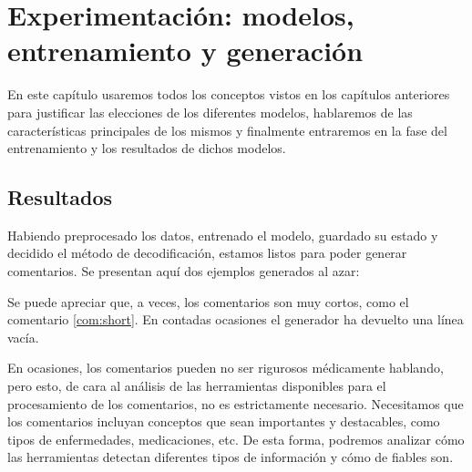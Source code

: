 \chapter{Experimentación: modelos, \\entrenamiento y generación}

En este capítulo usaremos todos los conceptos vistos en los capítulos anteriores para justificar las elecciones de los diferentes modelos, hablaremos de las características principales de los mismos y finalmente entraremos en la fase del entrenamiento y los resultados de dichos modelos.








\section{Resultados}

Habiendo preprocesado los datos, entrenado el modelo, guardado su estado y decidido el método de decodificación, estamos listos para poder generar comentarios. Se presentan aquí dos ejemplos generados al azar:

\begin{thm}
\end{thm}
\begin{thm}
\end{thm}


Se puede apreciar que, a veces, los comentarios son muy cortos, como el comentario \ref{com:short}. En contadas ocasiones el generador ha devuelto una línea vacía. 

En ocasiones, los comentarios pueden no ser rigurosos médicamente hablando, pero esto, de cara al análisis de las herramientas disponibles para el procesamiento de los comentarios, no es estrictamente necesario. Necesitamos que los comentarios incluyan conceptos que sean importantes y destacables, como tipos de enfermedades, medicaciones, etc. De esta forma, podremos analizar cómo las herramientas detectan diferentes tipos de información y cómo de fiables son. 

